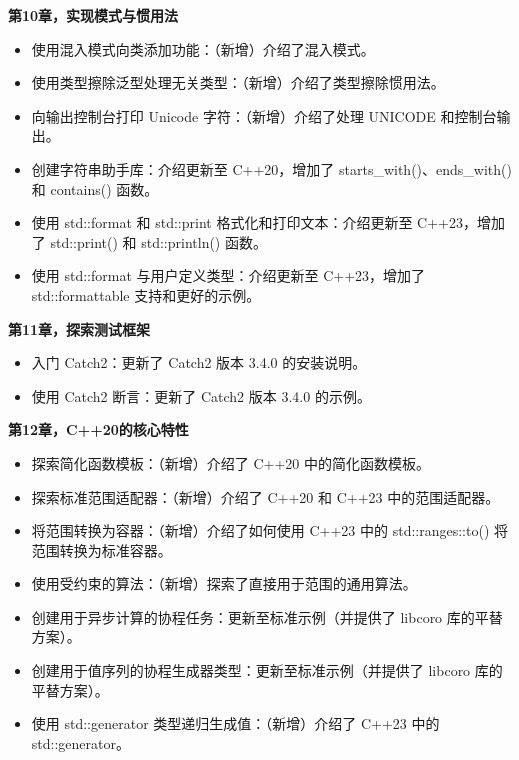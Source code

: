 \textbf{第10章，实现模式与惯用法}

\begin{itemize}
\item
使用混入模式向类添加功能：（新增）介绍了混入模式。

\item
使用类型擦除泛型处理无关类型：（新增）介绍了类型擦除惯用法。

\item
向输出控制台打印 Unicode 字符：（新增）介绍了处理 UNICODE 和控制台输出。

\item
创建字符串助手库：介绍更新至 C++20，增加了 starts\_with()、ends\_with() 和 contains() 函数。

\item
使用 std::format 和 std::print 格式化和打印文本：介绍更新至 C++23，增加了 std::print() 和 std::println() 函数。

\item
使用 std::format 与用户定义类型：介绍更新至 C++23，增加了 std::formattable 支持和更好的示例。
\end{itemize}

\textbf{第11章，探索测试框架}

\begin{itemize}
\item
入门 Catch2：更新了 Catch2 版本 3.4.0 的安装说明。

\item
使用 Catch2 断言：更新了 Catch2 版本 3.4.0 的示例。
\end{itemize}

\textbf{第12章，C++20的核心特性}

\begin{itemize}
\item
探索简化函数模板：（新增）介绍了 C++20 中的简化函数模板。

\item
探索标准范围适配器：（新增）介绍了 C++20 和 C++23 中的范围适配器。

\item
将范围转换为容器：（新增）介绍了如何使用 C++23 中的 std::ranges::to() 将范围转换为标准容器。

\item
使用受约束的算法：（新增）探索了直接用于范围的通用算法。

\item
创建用于异步计算的协程任务：更新至标准示例（并提供了 libcoro 库的平替方案）。

\item
创建用于值序列的协程生成器类型：更新至标准示例（并提供了 libcoro 库的平替方案）。

\item
使用 std::generator 类型递归生成值：（新增）介绍了 C++23 中的 std::generator。
\end{itemize}

